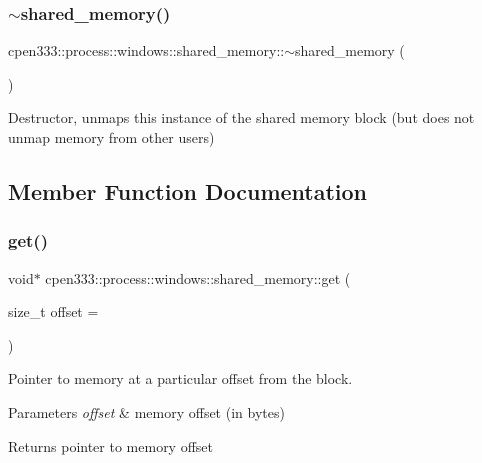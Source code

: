 \subsubsection{\texorpdfstring{$\sim$shared\+\_\+memory()}{~shared\_memory()}}
{\footnotesize\ttfamily cpen333\+::process\+::windows\+::shared\+\_\+memory\+::$\sim$shared\+\_\+memory (\begin{DoxyParamCaption}{ }\end{DoxyParamCaption})\hspace{0.3cm}{\ttfamily [inline]}}



Destructor, unmaps this instance of the shared memory block (but does not unmap memory from other users) 



\subsection{Member Function Documentation}
\mbox{\label{classcpen333_1_1process_1_1windows_1_1shared__memory_a3bbd718728dc2fa2fbe4058b8a207594}} 
\subsubsection{\texorpdfstring{get()}{get()}\hspace{0.1cm}{\footnotesize\ttfamily [1/3]}}
{\footnotesize\ttfamily void$\ast$ cpen333\+::process\+::windows\+::shared\+\_\+memory\+::get (\begin{DoxyParamCaption}\item[{size\+\_\+t}]{offset = {} }\end{DoxyParamCaption})\hspace{0.3cm}{\ttfamily [inline]}}



Pointer to memory at a particular offset from the block. 


\begin{DoxyParams}{Parameters}
{\em offset} & memory offset (in bytes) \\
\hline
\end{DoxyParams}
\begin{DoxyReturn}{Returns}
pointer to memory offset 
\end{DoxyReturn}
\mbox{\label{classcpen333_1_1process_1_1windows_1_1shared__memory_a2f2fa53c705df531b6126ed2da84c347}} 
